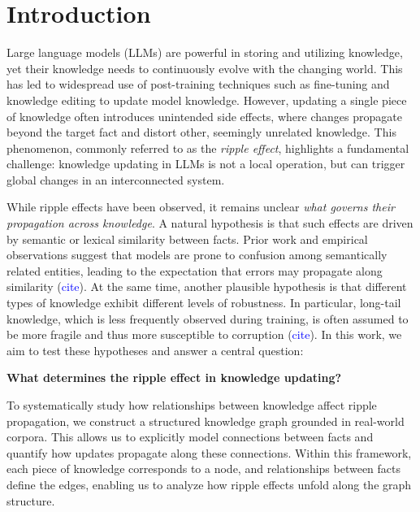 \section{Introduction}

Large language models (LLMs) are powerful in storing and utilizing knowledge, yet their knowledge needs to continuously evolve with the changing world. This has led to widespread use of post-training techniques such as fine-tuning and knowledge editing  to update model knowledge. However, updating a single piece of knowledge often introduces unintended side effects, where changes propagate beyond the target fact and distort other, seemingly unrelated knowledge. This phenomenon, commonly referred to as the \textit{ripple effect}, highlights a fundamental challenge: knowledge updating in LLMs is not a local operation, but can trigger global changes in an interconnected system.

While ripple effects have been observed, it remains unclear \textit{what governs their propagation across knowledge}. A natural hypothesis is that such effects are driven by semantic or lexical similarity between facts. Prior work and empirical observations suggest that models are prone to confusion among semantically related entities, leading to the expectation that errors may propagate along similarity (\textcolor{blue}{cite}). At the same time, another plausible hypothesis is that different types of knowledge exhibit different levels of robustness. In particular, long-tail knowledge, which is less frequently observed during training, is often assumed to be more fragile and thus more susceptible to corruption (\textcolor{blue}{cite}). 
In this work, we aim to test these hypotheses and answer a central question:

\textbf{What determines the ripple effect in knowledge updating?}

To systematically study how relationships between knowledge affect ripple propagation, we construct a structured knowledge graph grounded in real-world corpora. This allows us to explicitly model connections between facts and quantify how updates propagate along these connections. Within this framework, each piece of knowledge corresponds to a node, and relationships between facts define the edges, enabling us to analyze how ripple effects unfold along the graph structure.

